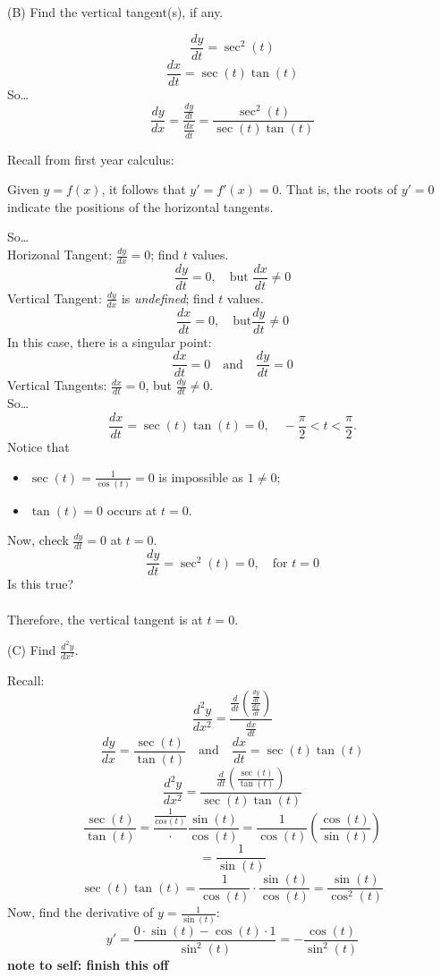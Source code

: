 \documentclass{article}
\begin{document}
(B) Find the vertical tangent(s), if any.
\begin{examplebox}
\[
    \frac{dy}{dt} = \sec^2(t)
\]
\[
    \frac{dx}{dt} = \sec(t)\tan(t)
\]
So\dots
\[
    \frac{dy}{dx} = \frac{\frac{dy}{dt}}{\frac{dx}{dt}} = \frac{\sec^2(t)}{\sec(t)\tan(t)}
\]

Recall from first year calculus:
\begin{theorembox}
    Given \( y = f(x) \), it follows that \( y' = f'(x) = 0 \). That is, the roots of \( y' = 0 \) indicate the positions of the horizontal tangents.
\end{theorembox}
So\dots\\
Horizonal Tangent: \( \frac{dy}{dx} = 0 \); find \( t \) values.
\[
    \frac{dy}{dt} = 0, \quad \text{but } \frac{dx}{dt} \neq 0
\]
Vertical Tangent: \( \frac{dy}{dx} \) is \textit{undefined}; find \( t \) values.
\[
    \frac{dx}{dt} = 0, \quad \text{but} \frac{dy}{dt} \neq 0
\]
In this case, there is a singular point:
\[
    \frac{dx}{dt} = 0 \quad \text{and} \quad \frac{dy}{dt} = 0
\]
Vertical Tangents: \( \frac{dx}{dt} = 0 \), but \( \frac{dy}{dt} \neq 0 \). \\
So\dots
\[
    \frac{dx}{dt} = \sec(t)\tan(t) = 0, \quad -\frac{\pi}{2} < t < \frac{\pi}{2} \text{.}
\]
Notice that
\begin{itemize}
    \item \( \sec(t) = \frac{1}{\cos(t)} = 0 \) is impossible as \( 1 \neq 0 \);
    \item \( \tan(t) = 0 \) occurs at \( t = 0 \).
\end{itemize}
Now, check \( \frac{dy}{dt} = 0 \) at \( t = 0 \).
\[
    \frac{dy}{dt} = \sec^2(t) = 0, \quad \text{for } t = 0
\]
Is this true? \\
\\
Therefore, the vertical tangent is at \( t = 0 \).
\end{examplebox}

(C) Find \( \frac{d^2y}{dx^2} \).
\begin{examplebox}
Recall:
\[
    \frac{d^2y}{dx^2} = \frac{\frac{d}{dt}(\frac{\frac{dy}{dt}}{\frac{dx}{dt}})}{\frac{dx}{dt}}
\]
\[
    \frac{dy}{dx} = \frac{\sec(t)}{\tan(t)} \quad \text{and} \quad \frac{dx}{dt} = \sec(t)\tan(t)
\]
\[
    \frac{d^2y}{dx^2} = \frac{\frac{d}{dt}(\frac{\sec(t)}{\tan(t)})}{\sec(t)\tan(t)}
\]
\[
    \frac{\sec(t)}{\tan(t)} = \frac{\frac{1}{cos(t)}} \cdot {\frac{\sin(t)}{\cos(t)}} = \frac{1}{\cos(t)}(\frac{\cos(t)}{\sin(t)})
\]
\[
    = \frac{1}{\sin(t)}
\]
\[
    \sec(t)\tan(t) = \frac{1}{\cos(t)} \cdot \frac{\sin(t)}{\cos(t)} = \frac{\sin(t)}{\cos^2(t)}
\]
Now, find the derivative of \( y = \frac{1}{\sin(t)}\):
\[
    y' = \frac{0 \cdot \sin(t) - \cos(t) \cdot 1}{\sin^2(t)} = -\frac{\cos(t)}{\sin^2(t)}
\]
\textbf{note to self: finish this off}
\end{examplebox}
\end{document}
